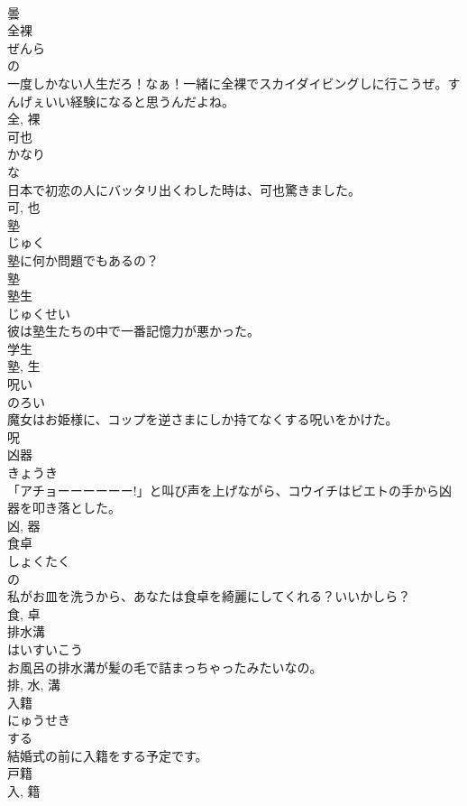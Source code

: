 \documentclass[8pt]{extreport}
\begin{document}
\begin{CJK}{UTF8}{min}
\\	曇	
\\	全裸	
\\	ぜんら	
\\	の 
\\	一度しかない人生だろ！なぁ！一緒に全裸でスカイダイビングしに行こうぜ。すんげぇいい経験になると思うんだよね。	
\\	全, 裸	
\\	可也	
\\	かなり	
\\	な 
\\	日本で初恋の人にバッタリ出くわした時は、可也驚きました。	
\\	可, 也	
\\	塾	
\\	じゅく	
\\	塾に何か問題でもあるの？	
\\	塾	
\\	塾生	
\\	じゅくせい	
\\	彼は塾生たちの中で一番記憶力が悪かった。	
\\	学生 
\\	塾, 生	
\\	呪い	
\\	のろい	
\\	魔女はお姫様に、コップを逆さまにしか持てなくする呪いをかけた。	
\\	呪	
\\	凶器	
\\	きょうき	
\\	「アチョーーーーーー!」と叫び声を上げながら、コウイチはビエトの手から凶器を叩き落とした。	
\\	凶, 器	
\\	食卓	
\\	しょくたく	
\\	の 
\\	私がお皿を洗うから、あなたは食卓を綺麗にしてくれる？いいかしら？	
\\	食, 卓	
\\	排水溝	
\\	はいすいこう	
\\	お風呂の排水溝が髪の毛で詰まっちゃったみたいなの。	
\\	排, 水, 溝	
\\	入籍	
\\	にゅうせき	
\\	する 
\\	結婚式の前に入籍をする予定です。	
\\	戸籍 
\\	入, 籍	

\end{CJK}
\end{document}
